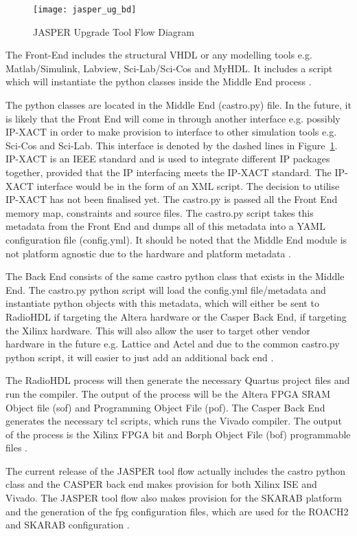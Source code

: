 \documentclass{ws-jai}
\begin{document}
\begin{figure}[h]
\centering
\texttt{[image: jasper\_ug\_bd]}
\caption{JASPER Upgrade Tool Flow Diagram}
\label{fig:jasper_ug_bd}
\end{figure}

The Front-End includes the structural VHDL or any modelling tools e.g. Matlab/Simulink, Labview, Sci-Lab/Sci-Cos and MyHDL. It includes a script which will instantiate the python classes inside the Middle End process \cite{Isaac16}.

The python classes are located in the Middle End (castro.py) file. In the future, it is likely that the Front End will come in through another interface e.g. possibly IP-XACT in order to make provision to interface to other simulation tools e.g. Sci-Cos and Sci-Lab. This interface is denoted by the dashed lines in Figure~\ref{fig:jasper_ug_bd}. IP-XACT is an IEEE standard and is used to integrate different IP packages together, provided that the IP interfacing meets the IP-XACT standard. The IP-XACT interface would be in the form of an XML script. The decision to utilise IP-XACT has not been finalised yet. The castro.py is passed all the Front End memory map, constraints and source files. The castro.py script takes this metadata from the Front End and dumps all of this metadata into a YAML configuration file (config.yml). It should be noted that the Middle End module is not platform agnostic due to the hardware and platform metadata \cite{Isaac16}.

The Back End consists of the same castro python class that exists in the Middle End. The castro.py python script will load the config.yml file/metadata and instantiate python objects with this metadata, which will either be sent to RadioHDL if targeting the Altera hardware or the Casper Back End, if targeting the Xilinx hardware. This will also allow the user to target other vendor hardware in the future e.g. Lattice and Actel and due to the common castro.py python script, it will easier to just add an additional back end \cite{Isaac16}.

The RadioHDL process will then generate the necessary Quartus project files and run the compiler. The output of the process will be the Altera FPGA SRAM Object file (sof) and Programming Object File (pof). The Casper Back End generates the necessary tcl scripts, which runs the Vivado compiler. The output of the process is the Xilinx FPGA bit and Borph Object File (bof) programmable files \cite{Isaac16}.

The current release of the JASPER tool flow actually includes the castro python class and the CASPER back end makes provision for both Xilinx ISE and Vivado. The JASPER tool flow also makes provision for the SKARAB platform and the generation of the fpg configuration files, which are used for the ROACH2 and SKARAB configuration \cite{Balla16}.
\end{document}

